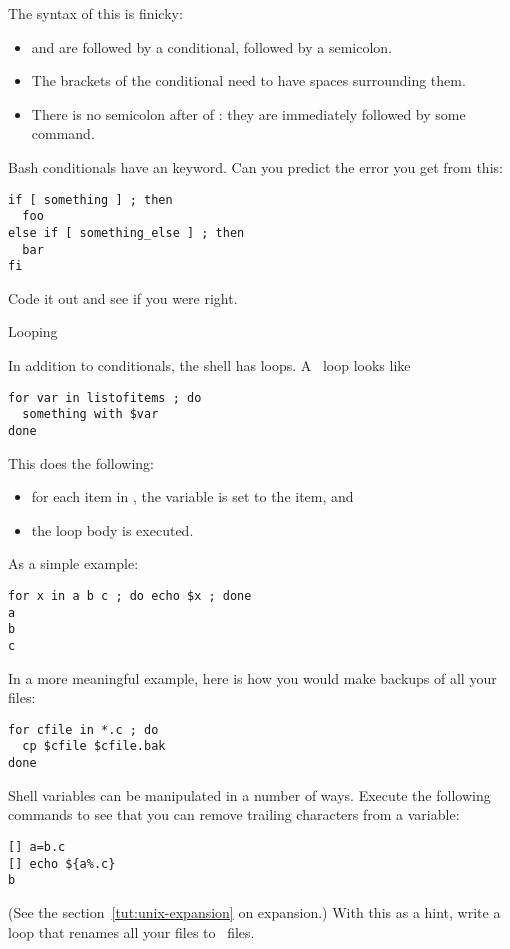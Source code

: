 The syntax of this is finicky:
\begin{itemize}
\item {} and  are followed by a
  conditional, followed by a semicolon.
\item The brackets of the conditional need to have spaces surrounding
  them.
\item There is no semicolon after  of :
  they are immediately followed by some command.
\end{itemize}

\begin{exercise}
  Bash conditionals have an  keyword.
  Can you predict the error you get from this:
\begin{verbatim}
if [ something ] ; then
  foo
else if [ something_else ] ; then
  bar
fi
\end{verbatim}
Code it out and see if you were right.
\end{exercise}

 {Looping}
\label{sec:unix-loop}

In addition to conditionals,
the shell has loops. A~ loop looks like
\begin{verbatim}
for var in listofitems ; do
  something with $var
done
\end{verbatim}
This does the following:
\begin{itemize}
\item for each item in , the variable  is set to the
  item, and
\item the loop body is executed.
\end{itemize}
As a simple example:
\begin{verbatim}
for x in a b c ; do echo $x ; done
a
b
c
\end{verbatim}
In a more meaningful example,
here is how you would make backups of all your~
files:
\begin{verbatim}
for cfile in *.c ; do
  cp $cfile $cfile.bak
done
\end{verbatim}
Shell variables can be manipulated in a number of ways.
Execute the following commands to see that you can remove trailing
characters from a variable:
\begin{verbatim}
[] a=b.c
[] echo ${a%.c}
b
\end{verbatim}
(See the section~\ref{tut:unix-expansion} on expansion.)
With this as a hint, write a loop that renames all your  files
to~ files.

